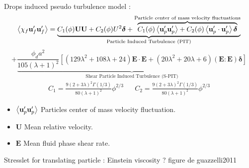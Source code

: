 \documentclass{sintefbeamer}
\begin{document}
\begin{frame}
    {
    Drops induced pseudo turbulence model : 
    }
    \small
    \begin{equation*}
      \left<\chi_f  \textbf{u}_f' \textbf{u}_f'\right>
      =
      \underbrace{
        C_1(\phi)\textbf{UU}
      + C_2(\phi)U^2 \bm\delta
      + \overbrace{C_1(\phi)\left<\textbf{u}_p'\textbf{u}_p'\right>
      + C_2(\phi)\left<\textbf{u}_{p}'\cdot \textbf{u}_{p}'\right>\bm\delta
      }^{\text{Particle center of mass velocity fluctuations}}
      }_\text{Particle Induced Turbulence (PIT)}
    \end{equation*}
    \begin{equation*}
      + \underbrace{\frac{\phi_d a^2 }{105 (\lambda +1)^2 }\left[
          (129\lambda^2+108\lambda+24)\textbf{E}\cdot \textbf{E}
          + (20\lambda^2 +20\lambda + 6)
          (\textbf{E} : \textbf{E})\bm\delta
      \right]}_\text{Shear Particle Induced Turbulence (S-PIT)}
  \end{equation*}
    \begin{align*}
      C_{1} = \frac{9(2+3\lambda)^2 \Gamma(1/3)}{80 (\lambda +1)^2}\phi^{2/3} 
      &&
      C_2 = \frac{9(2+3\lambda)^2 \Gamma(1/3)}{80 (\lambda +1)^2}\phi^{2/3} 
    \end{align*}
    \begin{itemize}
      \item $\left<\textbf{u}_p'\textbf{u}_p'\right>$ Particles center of mass velocity fluctuation.  
      \item $\textbf{U}$ Mean relative velocity. 
      \item $\textbf{E}$ Mean fluid phase shear rate. 
    \end{itemize}
\end{frame}
\begin{frame}
    {
    Stresslet for translating particle  : 
    }
    Einstein viscosity ? 
figure de guazzelli2011

  \end{frame}
\end{document}
